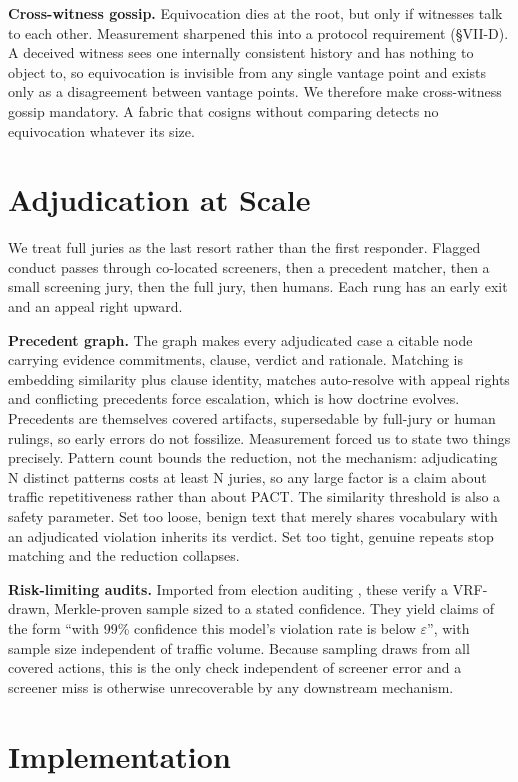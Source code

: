\documentclass[conference]{IEEEtran}
\begin{document}
\textbf{Cross-witness gossip.} Equivocation dies at the root, but only if witnesses talk to each other. Measurement sharpened this into a protocol requirement (\S{}VII-D). A deceived witness sees one internally consistent history and has nothing to object to, so equivocation is invisible from any single vantage point and exists only as a disagreement between vantage points. We therefore make cross-witness gossip mandatory. A fabric that cosigns without comparing detects no equivocation whatever its size.

\section{Adjudication at Scale}

We treat full juries as the last resort rather than the first responder. Flagged conduct passes through co-located screeners, then a precedent matcher, then a small screening jury, then the full jury, then humans. Each rung has an early exit and an appeal right upward.

\textbf{Precedent graph.} The graph makes every adjudicated case a citable node carrying evidence commitments, clause, verdict and rationale. Matching is embedding similarity plus clause identity, matches auto-resolve with appeal rights and conflicting precedents force escalation, which is how doctrine evolves. Precedents are themselves covered artifacts, supersedable by full-jury or human rulings, so early errors do not fossilize. Measurement forced us to state two things precisely. Pattern count bounds the reduction, not the mechanism: adjudicating N distinct patterns costs at least N juries, so any large factor is a claim about traffic repetitiveness rather than about PACT. The similarity threshold is also a safety parameter. Set too loose, benign text that merely shares vocabulary with an adjudicated violation inherits its verdict. Set too tight, genuine repeats stop matching and the reduction collapses.

\textbf{Risk-limiting audits.} Imported from election auditing \cite{r24}, these verify a VRF-drawn, Merkle-proven sample sized to a stated confidence. They yield claims of the form ``with 99\% confidence this model's violation rate is below $\varepsilon$'', with sample size independent of traffic volume. Because sampling draws from all covered actions, this is the only check independent of screener error and a screener miss is otherwise unrecoverable by any downstream mechanism.

\section{Implementation}
\end{document}
